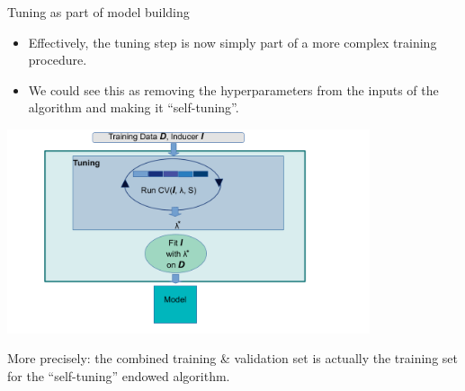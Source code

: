 \documentclass[11pt,compress,t,notes=noshow, xcolor=table]{beamer}
\begin{document}
\begin{vbframe}{Tuning as part of model building}
\begin{itemize}
\item Effectively, the tuning step is now simply part of a more complex training procedure.
\item We could see this as removing the hyperparameters from the inputs of the algorithm and making it \enquote{self-tuning}.
\end{itemize}
\begin{center}
\includegraphics[width=0.8\textwidth]{figure_man/autotune_in_model_fit.pdf}
\end{center}


\framebreak

More precisely: the combined training \& validation set is actually the training set for the \enquote{self-tuning} endowed algorithm.


\end{vbframe}
\end{document}
